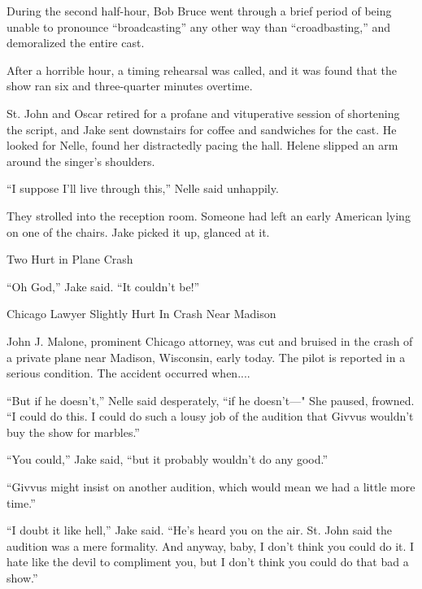 \documentclass{novel}
\begin{document}
During the second half-hour, Bob Bruce went through a brief period of being unable to pronounce “broadcasting” any other way than “croadbasting,” and demoralized the entire cast.

After a horrible hour, a timing rehearsal was called, and it was found that the show ran six and three-quarter minutes overtime.

St. John and Oscar retired for a profane and vituperative session of shortening the script, and Jake sent downstairs for coffee and sandwiches for the cast. He looked for Nelle, found her distractedly pacing the hall. Helene slipped an arm around the singer’s shoulders.

“I suppose I'll live through this,” Nelle said unhappily.

They strolled into the reception room. Someone had left an early American lying on one of the chairs. Jake picked it up, glanced at it.

Two Hurt in Plane Crash

“Oh God,” Jake said. “It couldn’t be!”

Chicago Lawyer Slightly Hurt In Crash Near Madison

John J. Malone, prominent Chicago attorney, was cut and bruised in the crash of a private plane near Madison, Wisconsin, early today. The pilot is reported in a serious condition. The accident occurred when....

\vspace{2\nbs}
\clearpage
\thispagestyle{empty}

\begin{ChapterStart}
\vspace{3\nbs}
\end{ChapterStart}

“But if he doesn’t,” Nelle said desperately, “if he doesn’t—" She paused, frowned. “I could do this. I could do such a lousy job of the audition that Givvus wouldn’t buy the show for marbles.”

“You could,” Jake said, “but it probably wouldn’t do any good.”

“Givvus might insist on another audition, which would mean we had a little more time.”

“I doubt it like hell,” Jake said. “He’s heard you on the air. St. John said the audition was a mere formality. And anyway, baby, I don’t think you could do it. I hate like the devil to compliment you, but I don’t think you could do that bad a show.”
\end{document}
